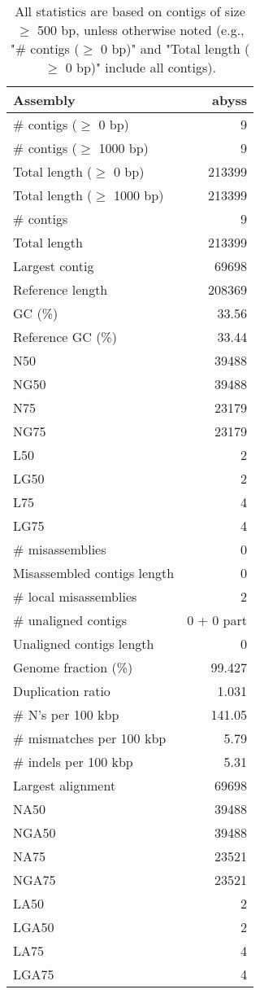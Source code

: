 \documentclass[12pt,a4paper]{article}
\begin{document}
\begin{table}[ht]
\begin{center}
\caption{All statistics are based on contigs of size $\geq$ 500 bp, unless otherwise noted (e.g., "\# contigs ($\geq$ 0 bp)" and "Total length ($\geq$ 0 bp)" include all contigs).}
\begin{tabular}{|l*{1}{|r}|}
\hline
Assembly & abyss \\ \hline
\# contigs ($\geq$ 0 bp) & 9 \\ \hline
\# contigs ($\geq$ 1000 bp) & 9 \\ \hline
Total length ($\geq$ 0 bp) & 213399 \\ \hline
Total length ($\geq$ 1000 bp) & 213399 \\ \hline
\# contigs & 9 \\ \hline
Total length & 213399 \\ \hline
Largest contig & 69698 \\ \hline
Reference length & 208369 \\ \hline
GC (\%) & 33.56 \\ \hline
Reference GC (\%) & 33.44 \\ \hline
N50 & 39488 \\ \hline
NG50 & 39488 \\ \hline
N75 & 23179 \\ \hline
NG75 & 23179 \\ \hline
L50 & 2 \\ \hline
LG50 & 2 \\ \hline
L75 & 4 \\ \hline
LG75 & 4 \\ \hline
\# misassemblies & 0 \\ \hline
Misassembled contigs length & 0 \\ \hline
\# local misassemblies & 2 \\ \hline
\# unaligned contigs & 0 + 0 part \\ \hline
Unaligned contigs length & 0 \\ \hline
Genome fraction (\%) & 99.427 \\ \hline
Duplication ratio & 1.031 \\ \hline
\# N's per 100 kbp & 141.05 \\ \hline
\# mismatches per 100 kbp & 5.79 \\ \hline
\# indels per 100 kbp & 5.31 \\ \hline
Largest alignment & 69698 \\ \hline
NA50 & 39488 \\ \hline
NGA50 & 39488 \\ \hline
NA75 & 23521 \\ \hline
NGA75 & 23521 \\ \hline
LA50 & 2 \\ \hline
LGA50 & 2 \\ \hline
LA75 & 4 \\ \hline
LGA75 & 4 \\ \hline
\end{tabular}
\end{center}
\end{table}
\end{document}
